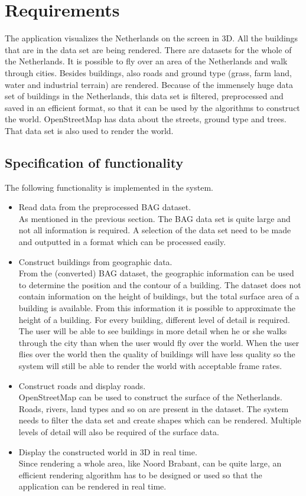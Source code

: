 \chapter{Requirements}
The application visualizes the Netherlands on the screen in 3D. All the buildings that are in the data set are being rendered. There are datasets for the whole of the Netherlands. It is possible to fly over an area of the Netherlands and walk through cities. Besides buildings, also roads and ground type (grass, farm land, water and industrial terrain) are rendered.
Because of the immensely huge data set of buildings in the Netherlands, this data set is filtered, preprocessed and saved in an efficient format, so that it can be used by the algorithms to construct the world. OpenStreetMap has data about the streets, ground type and trees. That data set is also used to render the world.

\section{Specification of functionality}
The following functionality is implemented in the system.
\begin{itemize}
  \item Read data from the preprocessed BAG dataset.\\
      As mentioned in the previous section. The BAG data set is quite large and not all information is required. A selection of the data set need to be made and outputted in a format which can be processed easily.
    \item Construct buildings from geographic data. \\
       From the (converted) BAG dataset, the geographic information can be used to determine the position and the contour of a building. The dataset does not contain information on the height of buildings, but the total surface area of a building is available. From this information it is possible to approximate the height of a building. For every building, different level of detail is required. The user will be able to see buildings in more detail when he or she walks through the city than when the user would fly over the world. When the user flies over the world then the quality of buildings will have less quality so the system will still be able to render the world with acceptable frame rates.
  \item Construct roads and display roads.\\
  OpenStreetMap can be used to construct the surface of the Netherlands. Roads, rivers, land types and so on are present in the dataset. The system needs to filter the data set and create shapes which can be rendered. Multiple levels of detail will also be required of the surface data.
  \item Display the constructed world in 3D in real time.\\
      Since rendering a whole area, like Noord Brabant, can be quite large, an efficient rendering algorithm has to be designed or used so that the application can be rendered in real time.
\end{itemize} 

